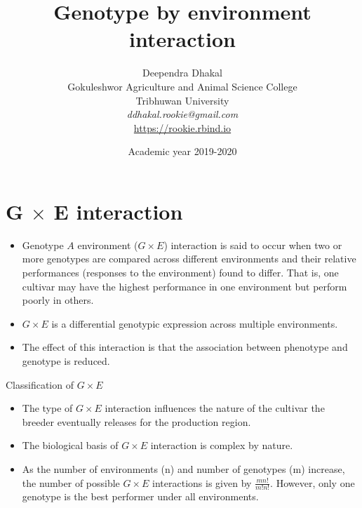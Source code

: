 \documentclass[11pt,dvipsnames,ignorenonframetext,aspectratio=169]{beamer}
\title[]{Genotype by environment interaction}
\author[
        Deependra Dhakal\\
Gokuleshwor Agriculture and Animal Science College\\
Tribhuwan University\\
\textit{ddhakal.rookie@gmail.com}\\
\url{https://rookie.rbind.io}
    ]{Deependra Dhakal\\
Gokuleshwor Agriculture and Animal Science College\\
Tribhuwan University\\
\textit{ddhakal.rookie@gmail.com}\\
\url{https://rookie.rbind.io}}
\date[
      Academic year 2019-2020
  ]{
      Academic year 2019-2020
        }
\providecommand{\tightlist}{%
  \setlength{\itemsep}{0pt}\setlength{\parskip}{0pt}}
\begin{document}
  \begin{frame}[plain]
  \titlepage
  \end{frame}



\hypertarget{g-times-e-interaction}{%
\section{\texorpdfstring{G \(\times\) E
interaction}{G \textbackslash{}times E interaction}}\label{g-times-e-interaction}}

\begin{frame}{}
\protect\hypertarget{section}{}

\begin{itemize}
\tightlist
\item
  Genotype \(A\) environment (\(G \times E\)) interaction is said to
  occur when two or more genotypes are compared across different
  environments and their relative performances (responses to the
  environment) found to differ. That is, one cultivar may have the
  highest performance in one environment but perform poorly in others.
\item
  \(G \times E\) is a differential genotypic expression across multiple
  environments.
\item
  The effect of this interaction is that the association between
  phenotype and genotype is reduced.
\end{itemize}

\end{frame}

\begin{frame}{Classification of \(G \times E\)}
\protect\hypertarget{classification-of-g-times-e}{}

\begin{itemize}
\tightlist
\item
  The type of \(G \times E\) interaction influences the nature of the
  cultivar the breeder eventually releases for the production region.
\item
  The biological basis of \(G \times E\) interaction is complex by
  nature.
\item
  As the number of environments (n) and number of genotypes (m)
  increase, the number of possible \(G \times E\) interactions is given
  by \(\frac{mn!}{m!n!}\). However, only one genotype is the best
  performer under all environments.
\end{itemize}

\end{frame}
\end{document}
